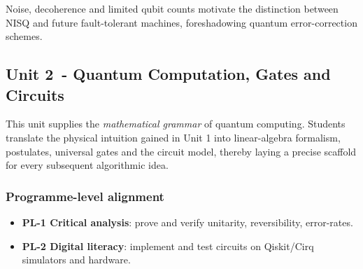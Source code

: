 Noise, decoherence and limited qubit counts motivate the distinction between NISQ and future fault-tolerant machines, 
foreshadowing quantum error-correction schemes.




\subsection*{Unit 2 - Quantum Computation, Gates and Circuits}

This unit supplies the \emph{mathematical grammar} of quantum computing.  
Students translate the physical intuition gained in Unit 1 into linear-algebra formalism, postulates, 
universal gates and the circuit model, thereby laying a precise scaffold for every subsequent algorithmic idea.

\subsubsection*{Programme-level alignment}
\begin{itemize}
	\item \textbf{PL-1 Critical analysis}: prove and verify unitarity, reversibility, error-rates.
	\item \textbf{PL-2 Digital literacy}: implement and test circuits on Qiskit/Cirq simulators and hardware.
\end{itemize}

